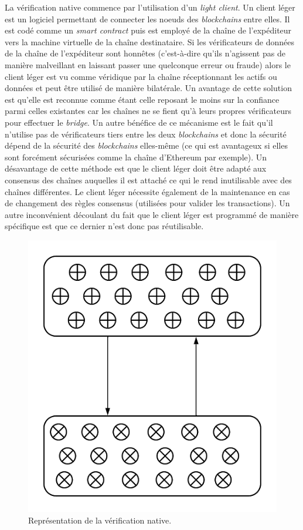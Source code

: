 La vérification native commence par l’utilisation d’un \textit{light client}\cite{NomadDocsNative}. Un client léger est un logiciel permettant de connecter les noeuds des \textit{\gls{blockchain}s} entre elles. Il est codé comme un \textit{\gls{smart contract}} puis est employé de la chaîne de l'expéditeur vers la machine virtuelle de la chaîne destinataire. Si les vérificateurs de données de la chaîne de l'expéditeur sont honnêtes (c’est-à-dire qu’ils n’agissent pas de manière malveillant en laissant passer une quelconque erreur ou fraude) alors le client léger est vu comme véridique par la chaîne réceptionnant les \gls{actif}s ou données et peut être utilisé de manière bilatérale.
 Un avantage de cette solution est qu’elle est reconnue comme étant celle reposant le moins sur la confiance parmi celles existantes car les chaînes ne se fient qu’à leurs propres vérificateurs pour effectuer le \textit{bridge}. Un autre bénéfice de ce mécanisme est le fait qu’il n’utilise pas de vérificateurs tiers entre les deux \textit{\gls{blockchain}s} et donc la sécurité dépend de la sécurité des \textit{\gls{blockchain}s} elles-même (ce qui est avantageux si elles sont forcément sécurisées comme la chaîne d’Ethereum par exemple).
 Un désavantage de cette méthode est que le client léger doit être adapté aux consensus des chaînes auquelles il est attaché ce qui le rend inutilisable avec des chaînes différentes. Le client léger nécessite également de la maintenance en cas de changement des règles consensus (utilisées pour valider les transactions). Un autre inconvénient découlant du fait que le client léger est programmé de manière spécifique est que ce dernier n’est donc pas réutilisable. \\
 \begin{figure}[h!]
    \centering
\includegraphics[scale=0.70]{centralisation/imagesBridges/DiagrammeVerifNative.png}
\caption{Représentation de la vérification native.}
\label{fig:NativeVerif}
\end{figure}

